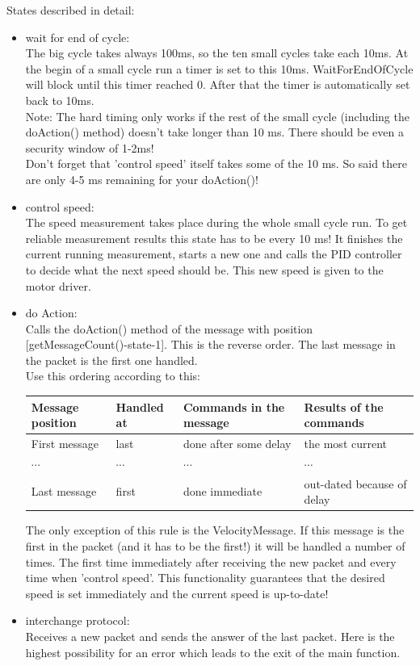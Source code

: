 States described in detail:
\begin{itemize}
\item wait for end of cycle:\\
The big cycle takes always 100ms, so the ten small cycles take each 10ms. At the begin of a small cycle run a timer is set to this 10ms. WaitForEndOfCycle will block until this timer reached 0. After that the timer is automatically set back to 10ms.\\

Note: The hard timing only works if the rest of the small cycle (including the doAction() method) doesn't take longer than 10 ms. There should be even a security window of 1-2ms!\\
Don't forget that 'control speed' itself takes some of the 10 ms. So said there are only 4-5 ms remaining for your doAction()!

\item control speed:\\
The speed measurement takes place during the whole small cycle run. To get reliable measurement results this state has to be every 10 ms! It finishes the current running measurement, starts a new one and calls the PID controller to decide what the next speed should be. This new speed is given to the motor driver.

\item do Action:\\
Calls the doAction() method of the message with position [getMessageCount()-state-1]. This is the reverse order. The last message in the packet is the first one handled.\\

Use this ordering according to this:\\
\begin{tabular}{l | l | l | l}
Message position & Handled at & Commands in the message & Results of the commands\\ \hline
First message    & last       & done after some delay   & the most current\\
$\cdots$ & $\cdots$ & $\cdots$ & $\cdots$\\
Last message     & first      & done immediate          & out-dated because of delay\\
\end{tabular}

The only exception of this rule is the VelocityMessage. If this message is the first in the packet (and it has to be the first!) it will be handled a number of times. The first time immediately after receiving the new packet and every time when 'control speed'. This functionality guarantees that the desired speed is set immediately and the current speed is up-to-date!

\item interchange protocol:\\
Receives a new packet and sends the answer of the last packet. Here is the highest possibility for an error which leads to the exit of the main function.

\end{itemize}

